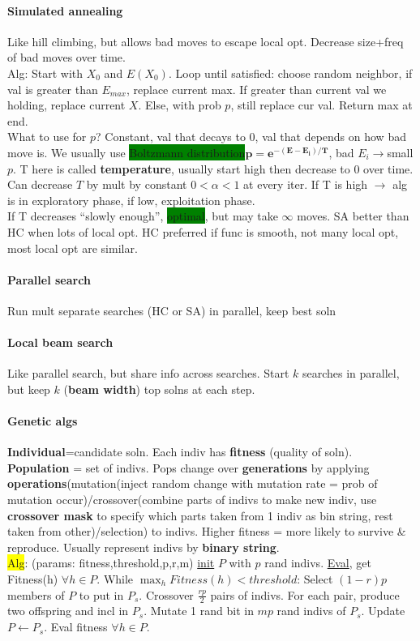 \paragraph{Simulated annealing} Like hill climbing, but allows bad
moves to escape local opt. Decrease size+freq of bad moves over
time. \\Alg: Start with $X_0$ and $E(X_0)$. Loop until satisfied:
choose random neighbor, if val is greater than $E_{max}$, replace
current max. If greater than current val we holding, replace current
$X$. Else, with prob $p$, still replace cur val. Return max at end.
\\ What to use for $p$? Constant, val that decays to $0$, val that
depends on how bad move is. We usually use \colorbox{green}{Boltzmann
  distribution}$\mathbf{p = e^{-(E-E_i)/T}}$, bad $E_i \to $small
$p$. T here is called \textbf{temperature}, usually start high then
decrease to 0 over time. Can decrease $T$ by mult by constant $0 <
\alpha < 1$ at every iter. If T is high $\to$ alg is in exploratory
phase, if low, exploitation phase.
\\ If T decreases ``slowly enough'', \colorbox{green}{optimal}, but
may take $\infty$ moves. SA better than HC when lots of local opt. HC
preferred if func is smooth, not many local opt, most local opt are
similar.
\paragraph{Parallel search} Run mult separate searches (HC or SA) in
parallel, keep best soln
\paragraph{Local beam search} Like parallel search, but share info
across searches. Start $k$ searches in parallel, but keep $k$
(\textbf{beam width}) top
solns at each step.
\paragraph{Genetic algs} \textbf{Individual}=candidate soln. Each
indiv has \textbf{fitness} (quality of soln). \textbf{Population} =
set of indivs. Pops change over \textbf{generations} by applying
\textbf{operations}(mutation(inject random change with mutation rate =
prob of mutation occur)/crossover(combine parts of indivs to make new
indiv, use \textbf{crossover mask} to specify which parts taken from 1
indiv as bin string, rest taken from other)/selection) to indivs. Higher
fitness = more likely to survive \& reproduce. Usually represent
indivs by \textbf{binary string}.
\\ \colorbox{yellow}{Alg}: (params: fitness,threshold,p,r,m) \underline{init} $P$ with
$p$ rand indivs. \underline{Eval}, get Fitness(h) $\forall h \in
P$. While $\max_h Fitness(h)<threshold$: Select $(1-r)p$ members of
$P$ to put in $P_s$. Crossover $\frac{rp}{2}$ pairs of indivs. For
each pair, produce two offspring and incl in $P_s$. Mutate 1 rand bit
in $mp$ rand indivs of $P_s$. Update $P \gets P_s$. Eval fitness
$\forall h \in P$.
